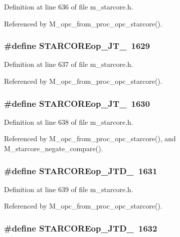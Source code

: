 Definition at line 636 of file m\_\-starcore.h.

Referenced by M\_\-opc\_\-from\_\-proc\_\-opc\_\-starcore().
\subsubsection{\setlength{\rightskip}{0pt plus 5cm}\#define STARCOREop\_\-JT\_~1629}\label{m__starcore_8h_20aa2521d6a2d33bba54cb3943a12907}




Definition at line 637 of file m\_\-starcore.h.

Referenced by M\_\-opc\_\-from\_\-proc\_\-opc\_\-starcore().
\subsubsection{\setlength{\rightskip}{0pt plus 5cm}\#define STARCOREop\_\-JT\_~1630}\label{m__starcore_8h_110f3d13b4d4fd2f6ee6703a2c6ba319}




Definition at line 638 of file m\_\-starcore.h.

Referenced by M\_\-opc\_\-from\_\-proc\_\-opc\_\-starcore(), and M\_\-starcore\_\-negate\_\-compare().
\subsubsection{\setlength{\rightskip}{0pt plus 5cm}\#define STARCOREop\_\-JTD\_~1631}\label{m__starcore_8h_b8466296908c91916f9f2fb9754dc4ff}




Definition at line 639 of file m\_\-starcore.h.

Referenced by M\_\-opc\_\-from\_\-proc\_\-opc\_\-starcore().
\subsubsection{\setlength{\rightskip}{0pt plus 5cm}\#define STARCOREop\_\-JTD\_~1632}\label{m__starcore_8h_fc624a38f861a18767015e484d965ad3}




